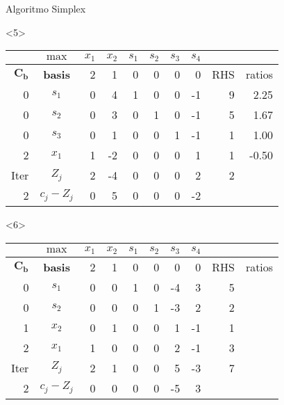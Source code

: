 \begin{frameExample}{Algoritmo Simplex}{}
\begin{onlyenv}<5>
    {\centering
      \begin{tabular}{rc|rrrrrr|rr}
  &  $\max$ & $x_1$ & $x_2$ & $s_1$ &$ s_2$ & $s_3$ & $s_4$ & & \\
  \toprule
$\mathbf{C_b}$ & \textbf{basis} & 2 & 1 & 0 & 0 & 0 & 0 & RHS & ratios \\
  \midrule
0 & $s_1$ & 0 & 4 & 1 & 0 & 0 & -1 & 9 & 2.25 \\
0 & $s_2$ & 0 & 3 & 0 & 1 & 0 & -1 & 5 & 1.67 \\
0 & $s_3$ & 0 & \cellcolor{yellow}1 & 0 & 0 & 1 & -1 & 1 & 1.00 \\
        2 & $x_1$ & 1 & -2 & 0 & 0 & 0 & 1 & 1 & -0.50 \\
        \midrule
Iter & $Z_j$ & 2 & -4 & 0 & 0 & 0 & 2 & 2 &  \\
2 & $c_j - Z_j$ & 0 & 5 & 0 & 0 & 0 & -2 &  & 
\end{tabular}
  \par}
\end{onlyenv}

\begin{onlyenv}<6>
    {\centering
      \begin{tabular}{rc|rrrrrr|rr}
  &  $\max$ & $x_1$ & $x_2$ & $s_1$ &$ s_2$ & $s_3$ & $s_4$ & & \\
  \toprule
$\mathbf{C_b}$ & \textbf{basis} & 2 & 1 & 0 & 0 & 0 & 0 & RHS & ratios \\
  \midrule
0 & $s_1$ & 0 & 0 & 1 & 0 & -4 & 3 & 5 &  \\
0 & $s_2$ & 0 & 0 & 0 & 1 & -3 & 2 & 2 &  \\
1 & $x_2$ & 0 & \cellcolor{yellow}1 & 0 & 0 & 1 & -1 & 1 &  \\
        2 & $x_1$ & 1 & 0 & 0 & 0 & 2 & -1 & 3 &  \\
        \midrule
Iter & $Z_j$ & 2 & 1 & 0 & 0 & 5 & -3 & 7 &  \\
2 & $c_j - Z_j$ & 0 & 0 & 0 & 0 & -5 & 3 &  & 
\end{tabular}
  \par}
\end{onlyenv}


\end{frameExample}
